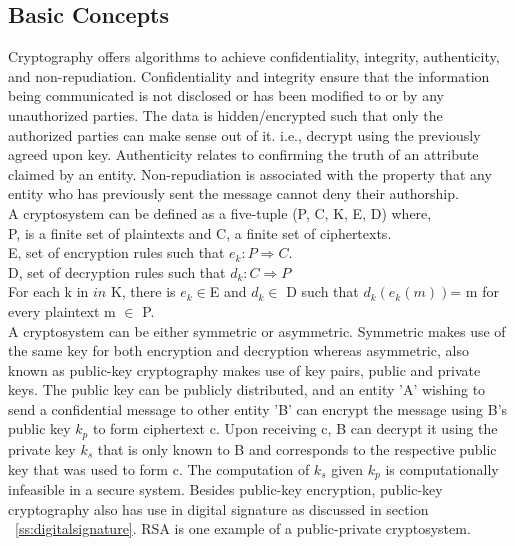 \subsection{Basic Concepts}
Cryptography offers algorithms to achieve confidentiality, integrity,
authenticity, and non-repudiation. Confidentiality and integrity ensure that
the information being communicated is not disclosed or has been modified to or
by any unauthorized parties. The data is hidden/encrypted such that only the
authorized parties can make sense out of it. i.e., decrypt using the previously
agreed upon key. Authenticity relates to confirming the truth of an attribute
claimed by an entity. Non-repudiation is associated with the property that any
entity who has previously sent the message cannot deny their
authorship\cite{katz1996handbook}. \\ 
A cryptosystem can be defined as a five-tuple (P, C, K, E, D) where, \\
P, is a finite set of plaintexts and C, a finite set of ciphertexts. \\
E, set of encryption rules such that $e_{k}:P \Rightarrow C $. \\ 
D, set of decryption rules such that $d_{k}:C \Rightarrow P$\\ 
For each k in $in$ K, there is $e_{k } \in$E and $d_{k } \in$ D such that
$d_{k}(e_{k}(m))$= m for every plaintext m $\in$ P.\\
A cryptosystem can be either symmetric or asymmetric. Symmetric makes use of
the same key for both encryption and decryption whereas asymmetric, also known
as public-key cryptography makes use of key pairs, public and private keys. The
public key can be publicly distributed, and an entity 'A' wishing to send a
confidential message to other entity 'B' can encrypt the message using B's
public key $k_{p}$ to form ciphertext c. Upon receiving c, B can decrypt it
using the private key $k_{s}$ that is only known to B and corresponds to the
respective public key that was used to form c. The computation of $k_{s}$ given
$k_{p}$ is computationally infeasible in a secure system. Besides public-key
encryption, public-key cryptography also has use in digital signature as
discussed in section ~\ref{ss:digitalsignature}. RSA\cite{rivest1978method} is
one example of a public-private cryptosystem.


